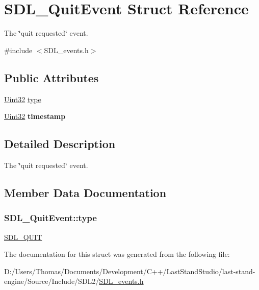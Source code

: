 \hypertarget{structSDL__QuitEvent}{}\section{S\+D\+L\+\_\+\+Quit\+Event Struct Reference}
\label{structSDL__QuitEvent}


The \char`\"{}quit requested\char`\"{} event.  




{\ttfamily \#include $<$S\+D\+L\+\_\+events.\+h$>$}

\subsection*{Public Attributes}
\begin{DoxyCompactItemize}
\item 
\hyperlink{SDL__stdinc_8h_add440eff171ea5f55cb00c4a9ab8672d}{Uint32} \hyperlink{structSDL__QuitEvent_a51ab0279e6de40249ba93971a8757cf0}{type}
\item 
\hypertarget{structSDL__QuitEvent_a7acd4fa42ca96da8edac146baaa0b433}{}\hyperlink{SDL__stdinc_8h_add440eff171ea5f55cb00c4a9ab8672d}{Uint32} {\bfseries timestamp}\label{structSDL__QuitEvent_a7acd4fa42ca96da8edac146baaa0b433}

\end{DoxyCompactItemize}


\subsection{Detailed Description}
The \char`\"{}quit requested\char`\"{} event. 

\subsection{Member Data Documentation}
\hypertarget{structSDL__QuitEvent_a51ab0279e6de40249ba93971a8757cf0}{}
\subsubsection[{type}]{ S\+D\+L\+\_\+\+Quit\+Event\+::type}\label{structSDL__QuitEvent_a51ab0279e6de40249ba93971a8757cf0}
\hyperlink{SDL__events_8h_a3b589e89be6b35c02e0dd34a55f3fccaa31acc5fdafc86ebe2c1f5c3cae48d603}{S\+D\+L\+\_\+\+Q\+U\+I\+T} 

The documentation for this struct was generated from the following file\+:\begin{DoxyCompactItemize}
\item 
D\+:/\+Users/\+Thomas/\+Documents/\+Development/\+C++/\+Last\+Stand\+Studio/last-\/stand-\/engine/\+Source/\+Include/\+S\+D\+L2/\hyperlink{SDL__events_8h}{S\+D\+L\+\_\+events.\+h}\end{DoxyCompactItemize}
